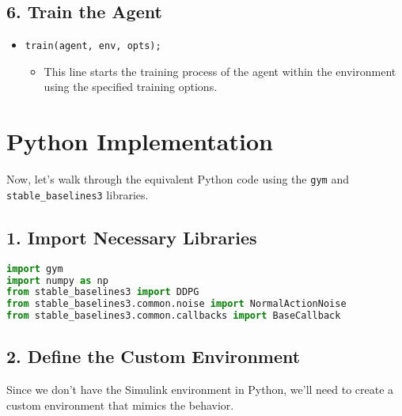 \documentclass[12pt]{article}
\begin{document}
\subsection*{6. Train the Agent}

\begin{itemize}
    \item \texttt{train(agent, env, opts);}
    \begin{itemize}
        \item This line starts the training process of the agent within the environment using the specified training options.
    \end{itemize}
\end{itemize}

\section*{Python Implementation}

Now, let's walk through the equivalent Python code using the \texttt{gym} and \texttt{stable\_baselines3} libraries.

\subsection*{1. Import Necessary Libraries}

\begin{lstlisting}[language=Python, breaklines=true]
import gym
import numpy as np
from stable_baselines3 import DDPG
from stable_baselines3.common.noise import NormalActionNoise
from stable_baselines3.common.callbacks import BaseCallback
\end{lstlisting}

\subsection*{2. Define the Custom Environment}

Since we don't have the Simulink environment in Python, we'll need to create a custom environment that mimics the behavior.
\end{document}

